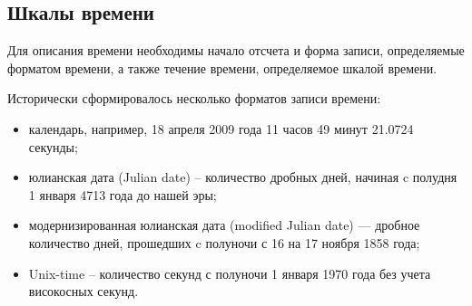 \subsection{Шкалы времени}
 Для описания времени необходимы начало отсчета и форма записи, определяемые форматом времени, 
 а также течение времени, определяемое шкалой времени.

Исторически сформировалось несколько форматов записи времени:
\begin{itemize}
    \item календарь, например, 18 апреля 2009 года 11 часов 49 минут
    21.0724 секунды;
    \item юлианская дата (Julian date) -- количество дробных дней, начиная c полудня 1 января
    4713 года до нашей эры;
    \item модернизированная юлианская дата (modified Julian date) —
    дробное количество дней, прошедших c полуночи с 16 на 17 ноября 1858 года;
    \item Unix-time -- количество секунд с полуночи 1 января 1970 года без
    учета високосных секунд.
\end{itemize}

